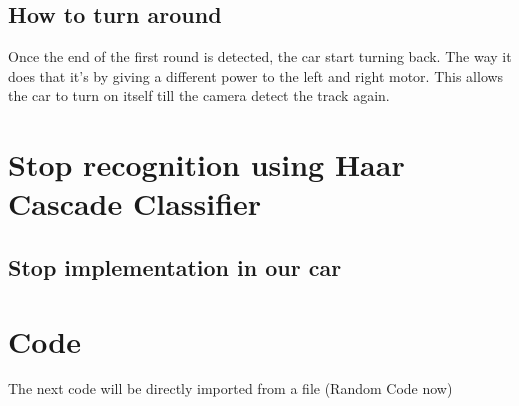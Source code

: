 \documentclass[12pt,a4paper]{article}
\begin{document}
\begin{large}
\subsection{How to turn around}
Once the end of the first round is detected, the car start turning back. The way it does that it's by giving a different power to the left and right motor. This allows the car to turn on itself till the camera detect the track again.\\

\section{Stop recognition using Haar Cascade Classifier}

\subsection{}

\subsection{}

\subsection{}

\subsection{Stop implementation in our car}


\section{Code}

The next code will be directly imported from a file (Random Code now)




\end{large}
\end{document}
